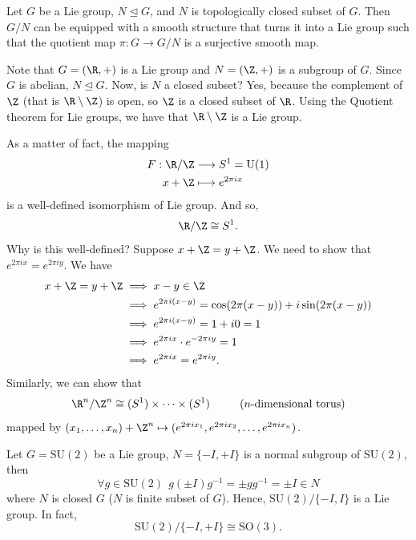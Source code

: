 \begin{theorem}
    Let \( G  \) be a Lie group, \( N \trianglelefteq G  \), and \( N  \) is topologically closed subset of \( G  \). Then \( G /N  \) can be equipped with a smooth structure that turns it into a Lie group such that the quotient map \( \pi : G \to G / N  \) is a surjective smooth map.
\end{theorem}

\begin{eg}[\( \R / \Z  \)]
   Note that \( G = (\R , + ) \) is a Lie group and \( N = (\Z , + ) \) is a subgroup of \( G  \). Since \( G  \) is abelian, \( N \trianglelefteq G  \). Now, is \( N  \) a closed subset? Yes, because the complement of \( \Z  \) (that is \(  \R \setminus  \Z  \)) is open, so \( \Z  \) is a closed subset of \( \R  \).    
   Using the Quotient theorem for Lie groups, we have that \( \R \setminus  \Z   \) is a Lie group.

   As a matter of fact, the mapping 
   \begin{align*}
       F : \R / \Z &\longrightarrow S^{1} = \text{U}(1)  \\ 
       x + \Z &\longmapsto e^{2\pi i x}  
    \end{align*}
   is a well-defined isomorphism of Lie group. And so,
   \[  \R / \Z \cong S^{1}. \]
   Why is this well-defined? Suppose \( x + \Z = y + \Z   \). We need to show that \( e^{2\pi i x } = e^{2 \pi i y } \). We have  
   \begin{align*}
       x + \Z = y + \Z &\implies x - y \in \Z  \\
                       &\implies e^{2\pi i (x - y)} = \cos(2 \pi (x - y)) + i \sin(2 \pi (x - y)) \\ 
                       &\implies e^{2 \pi i (x -y)} = 1 + i 0 = 1 \\
                       &\implies e^{2 \pi i x } \cdot e^{- 2 \pi i y } = 1  \\ 
                       &\implies e^{2\pi i x } = e^{2 \pi i y}.
   \end{align*}
   Similarly, we can show that 
   \[  \R^{n} / \Z^{n} \cong (S^{1}) \times \cdots \times (S^{1}) \ \ \tag{\( n  \)-dimensional torus} \]
   mapped by \( ({x}_{1}, \dots, {x}_{n}) + \Z^{n} \mapsto (e^{2\pi i {x}_{1}}, e^{2\pi i {x}_{2}}, \dots, e^{2 \pi i {x}_{n}}) \).
\end{eg}

\begin{eg}
   Let \( G = \text{SU}(2) \) be a Lie group, \( N = \{  - I , + I  \}   \) is a normal subgroup of \( \text{SU}(2) \), then 
   \[  \forall g \in \text{SU}(2) \ \ g(\pm I) g^{-1}  = \pm g g^{-1} = \pm I  \in N \]
   where \( N  \) is closed \( G  \) (\( N  \) is finite subset of \( G  \)).
   Hence, \( \text{SU}(2) / \{ - I , I  \}   \) is a Lie group. In fact, 
   \[  \text{SU}(2) / \{  - I , + I  \}  \cong \text{SO}(3). \]
\end{eg}
